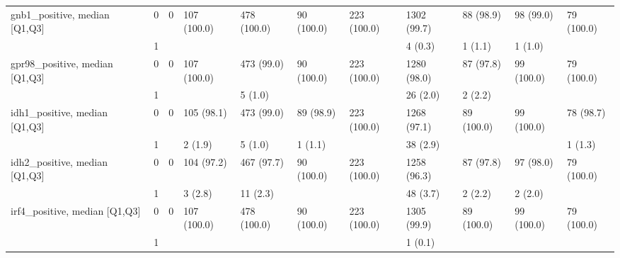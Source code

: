 \begin{tabular}{lllllllllll}
gnb1\_positive, median [Q1,Q3] & 0 &                    0 &         107 (100.0) &        478 (100.0) &           90 (100.0) &         223 (100.0) &       1302 (99.7) &         88 (98.9) &           98 (99.0) &           79 (100.0) \\
                 & 1 &                      &                     &                    &                      &                     &           4 (0.3) &           1 (1.1) &             1 (1.0) &                      \\
gpr98\_positive, median [Q1,Q3] & 0 &                    0 &         107 (100.0) &         473 (99.0) &           90 (100.0) &         223 (100.0) &       1280 (98.0) &         87 (97.8) &          99 (100.0) &           79 (100.0) \\
                 & 1 &                      &                     &            5 (1.0) &                      &                     &          26 (2.0) &           2 (2.2) &                     &                      \\
idh1\_positive, median [Q1,Q3] & 0 &                    0 &          105 (98.1) &         473 (99.0) &            89 (98.9) &         223 (100.0) &       1268 (97.1) &        89 (100.0) &          99 (100.0) &            78 (98.7) \\
                 & 1 &                      &             2 (1.9) &            5 (1.0) &              1 (1.1) &                     &          38 (2.9) &                   &                     &              1 (1.3) \\
idh2\_positive, median [Q1,Q3] & 0 &                    0 &          104 (97.2) &         467 (97.7) &           90 (100.0) &         223 (100.0) &       1258 (96.3) &         87 (97.8) &           97 (98.0) &           79 (100.0) \\
                 & 1 &                      &             3 (2.8) &           11 (2.3) &                      &                     &          48 (3.7) &           2 (2.2) &             2 (2.0) &                      \\
irf4\_positive, median [Q1,Q3] & 0 &                    0 &         107 (100.0) &        478 (100.0) &           90 (100.0) &         223 (100.0) &       1305 (99.9) &        89 (100.0) &          99 (100.0) &           79 (100.0) \\
                 & 1 &                      &                     &                    &                      &                     &           1 (0.1) &                   &                     &                      \\

\end{tabular}

